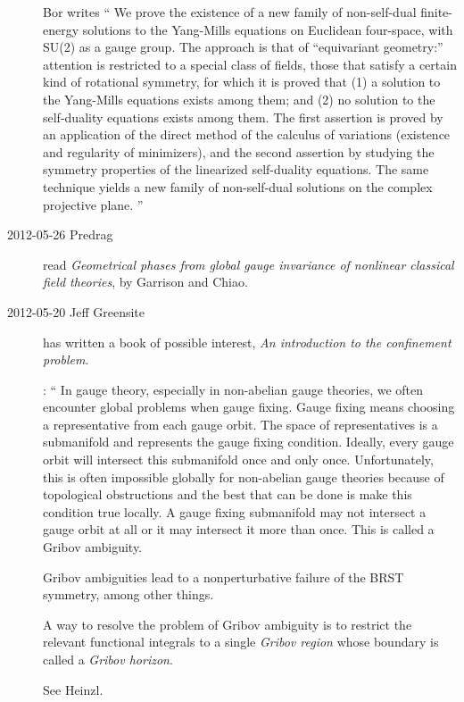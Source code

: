 \begin{description}

Bor writes
``
We prove the existence of a new family of non-self-dual finite-energy
solutions to the Yang-Mills equations on Euclidean four-space, with SU(2)
as a gauge group. The approach is that of ``equivariant geometry:''
attention is restricted to a special class of fields, those that satisfy
a certain kind of rotational symmetry, for which it is proved that (1) a
solution to the Yang-Mills equations exists among them; and (2) no
solution to the self-duality equations exists among them. The first
assertion is proved by an application of the direct method of the
calculus of variations (existence and regularity of minimizers), and the
second assertion by studying the symmetry properties of the linearized
self-duality equations. The same technique yields a new family of
non-self-dual solutions on the complex projective plane.
''

\item[2012-05-26 Predrag] read
{\it Geometrical phases from global gauge invariance of nonlinear classical field theories},
by Garrison and Chiao.

\item[2012-05-20 Jeff Greensite] has written a book of possible interest,
\emph{An introduction to the confinement problem}.

:
``
In gauge theory, especially in non-abelian gauge theories, we often
encounter global problems when gauge fixing. Gauge fixing means choosing
a representative from each gauge orbit. The space of representatives is a
submanifold and represents the gauge fixing condition. Ideally, every
gauge orbit will intersect this submanifold once and only once.
Unfortunately, this is often impossible globally for non-abelian gauge
theories because of topological obstructions and the best that can be
done is make this condition true locally. A gauge fixing submanifold may
not intersect a gauge orbit at all or it may intersect it more than once.
This is called a Gribov ambiguity.

Gribov ambiguities lead to a nonperturbative failure of the BRST
symmetry, among other things.

A way to resolve the problem of Gribov ambiguity is to restrict the
relevant functional integrals to a single \emph{Gribov region} whose
boundary is called a \emph{Gribov horizon}.

See Heinzl.

\end{description}
